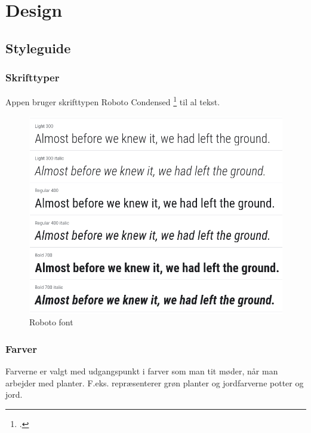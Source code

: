 \newpage
\section{Design}

\subsection{Styleguide}

\subsubsection*{Skrifttyper}

Appen bruger skrifttypen Roboto Condensed \footcite{roboto-condensed} til al tekst.

\begin{figure}[H]
    \label{font}
    \centering
    \includegraphics[width=1\textwidth]{img/s1-11.png}
    \caption{Roboto font}
\end{figure}

\subsubsection*{Farver}

Farverne er valgt med udgangspunkt i farver som man tit møder, når man arbejder med planter. F.eks. repræsenterer grøn planter og jordfarverne potter og jord.

